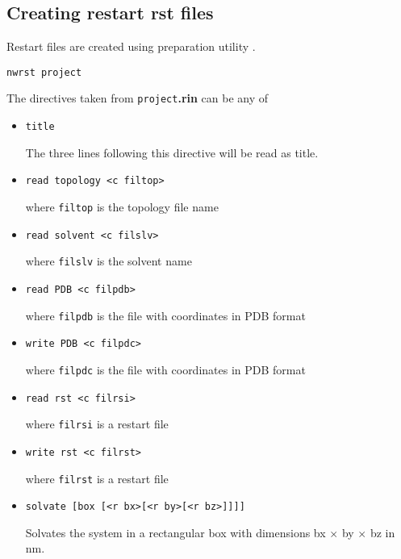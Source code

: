 \subsection{Creating restart {\bf rst} files}
\label{nwrst}
Restart files are created using preparation utility \nwrst.
\begin{verbatim}
nwrst project
\end{verbatim}
The directives taken from {\tt project}{\bf.rin} can be any of
\begin{itemize}

\item
\begin{verbatim}
title
\end{verbatim}
The three lines following this directive will be read as title.

\item
\begin{verbatim}
read topology <c filtop>
\end{verbatim}
where {\tt filtop} is the topology file name

\item
\begin{verbatim}
read solvent <c filslv>
\end{verbatim}
where {\tt filslv} is the solvent name

\item
\begin{verbatim}
read PDB <c filpdb>
\end{verbatim}
where {\tt filpdb} is the file with coordinates in PDB format

\item
\begin{verbatim}
write PDB <c filpdc>
\end{verbatim}
where {\tt filpdc} is the file with coordinates in PDB format

\item
\begin{verbatim}
read rst <c filrsi>
\end{verbatim}
where {\tt filrsi} is a restart file

\item
\begin{verbatim}
write rst <c filrst>
\end{verbatim}
where {\tt filrst} is a restart file

\item
\begin{verbatim}
solvate [box [<r bx>[<r by>[<r bz>]]]]
\end{verbatim}
Solvates the system in a rectangular box with dimensions 
bx $\times$ by $\times$ bz in nm.


\end{itemize}
